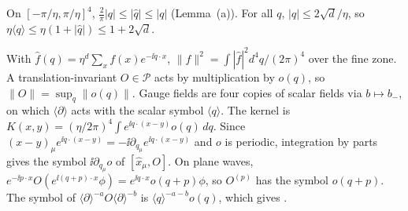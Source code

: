 \begin{detail}\label{d11a:F1}
\begin{step}[Momenta]
On $[-\pi/\eta,\pi/\eta]^4$, $\frac2\pi|q|\le|\hat q|\le|q|$ (Lemma~(a)). For all $q$, $|\hat q|\le2\sqrt d/\eta$, so $\eta\langle q\rangle\le\eta(1+|\hat q|)\le1+2\sqrt d$.
\end{step}
\begin{step}[Multipliers]
With $\hat f(q)=\eta^d\sum_xf(x)e^{-\ii q\cdot x}$, $\|f\|^2=\int|\hat f|^2d^4q/(2\pi)^4$ over the fine zone. A translation-invariant $O\in\mathscr P$ acts by multiplication by $o(q)$, so $\|O\|=\sup_q\|o(q)\|$. Gauge fields are four copies of scalar fields via $b\mapsto b_-$, on which $\langle\partial\rangle$ acts with the scalar symbol $\langle q\rangle$. The kernel is $K(x,y)=(\eta/2\pi)^4\int e^{\ii q\cdot(x-y)}o(q)\,dq$. Since $(x-y)_\mu e^{\ii q\cdot(x-y)}=-\ii\partial_{q_\mu}e^{\ii q\cdot(x-y)}$ and $o$ is periodic, integration by parts gives the symbol $\ii\partial_{q_\mu}o$ of $[\hat x_\mu,O]$. On plane waves, $e^{-\ii p\cdot x}O(e^{\ii(q+p)\cdot x}\phi)=e^{\ii q\cdot x}o(q+p)\phi$, so $O^{(p)}$ has the symbol $o(q+p)$. The symbol of $\langle\partial\rangle^{-a}O\langle\partial\rangle^{-b}$ is $\langle q\rangle^{-a-b}o(q)$, which gives .
\end{step}
\end{detail}

